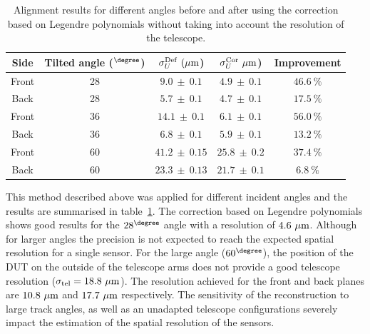             \begin{table}[!tbh]
        \centering
        \begin{tabular}{c c c c c}
          \hline %
          Side &  Tilted angle ($^{\degree}$)  &   $\sigma_{U}^{\rm{Def}}~(\rm{\mu m}$) &   $\sigma_{U}^{\rm{Cor}}~\rm{\mu m}$) & Improvement \\
          \hline %
          \hline %
          Front &      28       & $ 9.0 \ \pm \ 0.1 $ & $ 4.9 \ \pm \ 0.1 $ &    $46.6 \ \%$  \tabularnewline
          Back  &      28       & $ 5.7 \ \pm \ 0.1 $ & $ 4.7 \ \pm \ 0.1 $ &    $17.5 \ \%$  \tabularnewline
          \hline %
          Front &      36       & $ 14.1 \ \pm \ 0.1 $ & $ 6.1 \ \pm \ 0.1 $ &    $56.0 \ \%$ \tabularnewline
          Back  &      36       & $ 6.8 \ \pm \ 0.1 $ & $ 5.9 \ \pm \ 0.1 $ &    $13.2 \ \%$  \tabularnewline
          \hline %
          Front &      60       & $ 41.2 \ \pm \ 0.15$ & $25.8 \ \pm \ 0.2$  &    $37.4 \ \%$ \tabularnewline
          Back  &      60       & $ 23.3 \ \pm \ 0.13$ & $21.7 \ \pm \ 0.1$  &    $6.8 \ \%$  \tabularnewline
          \hline %
        \end{tabular}
        \caption{Alignment results for different angles before and after using the correction based on Legendre polynomials without taking into account the resolution of the telescope.}
        \label{tab:correctionOfDeformation}
      \end{table}

      This method described above was applied for different incident angles and the results are summarised in table~\ref{tab:correctionOfDeformation}. 
      The correction based on Legendre polynomials shows good results for the $28^{\degree}$ angle with a resolution of $4.6~\rm{\mu m}$.
      Although for larger angles the precision is not expected to reach the expected spatial resolution for a single sensor.
      For the large angle ($60^{\degree}$), the position of the \gls{DUT} on the outside of the telescope arms does not provide a good telescope resolution ($\sigma_{\rm{tel}} = 18.8~\rm{\mu m}$).
      The resolution achieved for the front and back planes are $10.8~\rm{\mu m}$ and $17.7~\rm{\mu m}$ respectively.
      The sensitivity of the reconstruction to large track angles, as well as an unadapted telescope configurations severely impact the estimation of the spatial resolution of the sensors.



